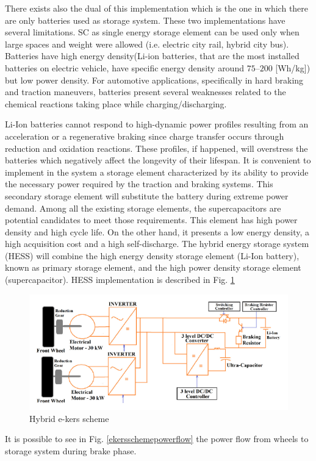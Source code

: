 \documentclass[11pt]{article}
\begin{document}
There exists also the dual of this implementation which is the one in which there are only batteries used as storage system. These two implementations have several limitations. SC as single energy storage element can be used only when large spaces and weight were allowed (i.e. electric city rail, hybrid city bus). Batteries have high energy density(Li-ion batteries, that are the most installed batteries on electric vehicle, have specific energy density around $75–200$ [Wh/kg]) but low power density. For automotive applications, specifically in hard braking and traction maneuvers, batteries present several weaknesses related to the chemical reactions taking place while charging/discharging. 

Li-Ion batteries cannot respond to high-dynamic power profiles resulting from an acceleration or a regenerative braking since charge transfer occurs through reduction and oxidation reactions. These profiles, if happened, will overstress the batteries which negatively affect the longevity of their lifespan. It is convenient to implement in the system a storage element characterized by its ability to provide the necessary power required by the traction and braking systems. This secondary storage element will substitute the battery during extreme power demand. Among all the existing storage elements, the supercapacitors are potential candidates to meet those requirements. This element has high power density and high cycle life. On the other hand, it presents a low energy density, a high acquisition cost and a high self-discharge. The hybrid energy storage system (HESS) will combine the high energy density storage element (Li-Ion battery), known as primary storage element, and the high power density storage element (supercapacitor). HESS implementation is described in Fig. \ref{ekersschemehybrid}

\begin{figure}[H]
	\centering
	\includegraphics[width=.6\textwidth]{Images/State_of_the_art/Electric_KERS_scheme_hybrid.PNG}
	\caption{Hybrid e-kers scheme}
	\label{ekersschemehybrid}
\end{figure}

It is possible to see in Fig. \ref{ekersschemepowerflow} the power flow from wheels to storage system during brake phase.
\end{document}
